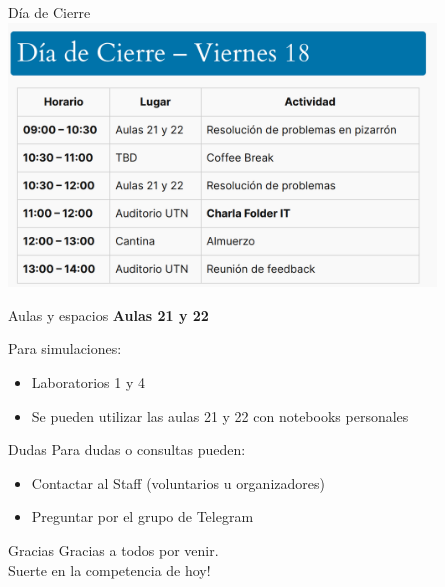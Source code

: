 \documentclass{beamer}
\begin{document}
\begin{frame}{Día de Cierre}
    \centering
    \includegraphics[clip,height=7cm,keepaspectratio]{img/crono_05.png}
\end{frame}

\begin{frame}{Aulas y espacios}
    \centering
    {\bf Aulas 21 y 22}
    
    \vspace{1cm}
    
    Para simulaciones:
    \begin{itemize}
        \item Laboratorios 1 y 4
        \item Se pueden utilizar las aulas 21 y 22 con notebooks personales
    \end{itemize}
\end{frame}

\begin{frame}{Dudas}
Para dudas o consultas pueden:
        \begin{itemize}
            \item Contactar al Staff (voluntarios u organizadores)
            \item Preguntar por el grupo de Telegram
        \end{itemize}
\end{frame}

\begin{frame}{Gracias}
    \centering
    Gracias a todos por venir.\\
    Suerte en la competencia de hoy!
\end{frame}
\end{document}
